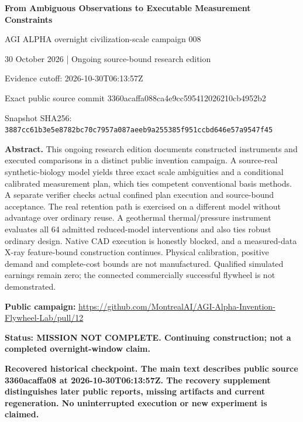 \documentclass[11pt,letterpaper]{article}
\begin{document}
{\LARGE\bfseries From Ambiguous Observations to Executable Measurement Constraints}\par
{\large AGI ALPHA overnight civilization-scale campaign 008}\par
\vspace{0.3em}
30 October 2026 | Ongoing source-bound research edition\par
\small Evidence cutoff: 2026-10-30T06:13:57Z\par
\small Exact public source commit 3360acaffa088ca4e9cc595412026210cb4952b2\par
\small Snapshot SHA256: \texttt{3887cc61b3e5e8782bc70c7957a087aeeb9a255385f951ccbd646e57a9547f45}\par
\normalsize\vspace{0.7em}
\textbf{Abstract.} This ongoing research edition documents constructed instruments and executed comparisons in a distinct public invention campaign. A source-real synthetic-biology model yields three exact scale ambiguities and a conditional calibrated measurement plan, which ties competent conventional basis methods. A separate verifier checks actual confined plan execution and source-bound acceptance. The real retention path is exercised on a different model without advantage over ordinary reuse. A geothermal thermal/pressure instrument evaluates all 64 admitted reduced-model interventions and also ties robust ordinary design. Native CAD execution is honestly blocked, and a measured-data X-ray feature-bound construction continues. Physical calibration, positive demand and complete-cost bounds are not manufactured. Qualified simulated earnings remain zero; the connected commercially successful flywheel is not demonstrated.\par
\vspace{0.4em}\textbf{Public campaign:} \url{https://github.com/MontrealAI/AGI-Alpha-Invention-Flywheel-Lab/pull/12}\par
\textbf{Status: MISSION NOT COMPLETE. Continuing construction; not a completed overnight-window claim.}\par
\vspace{0.4em}
\textbf{Recovered historical checkpoint. The main text describes public source 3360acaffa08 at 2026-10-30T06:13:57Z. The recovery supplement distinguishes later public reports, missing artifacts and current regeneration. No uninterrupted execution or new experiment is claimed.}\par
\end{document}
